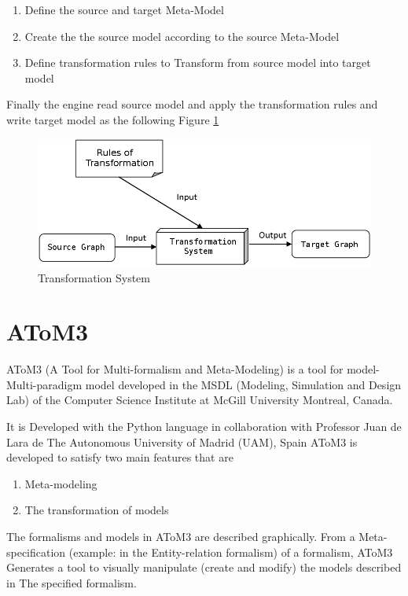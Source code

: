 \begin{enumerate}
\item Define the  source and target Meta-Model 
\item Create the the source model according to the source Meta-Model 
\item Define transformation rules to Transform from source model into target model 
\end{enumerate} 
Finally the engine read source model and apply the transformation rules and write target model as the following Figure \ref{fig:Transformation System}
 
\begin{figure}[th]
	\centering
		\includegraphics[scale=0.4]{ch3/img/systemTran}
	\caption{\label{fig:Transformation System}Transformation System\cite{ch3-img}}
\end{figure} 

\section{AToM3}

AToM3 (A Tool for Multi-formalism and Meta-Modeling) is a tool for model-
Multi-paradigm model developed in the MSDL (Modeling, Simulation and
Design Lab) of the Computer Science Institute at McGill University Montreal, Canada\cite{Siteatom, ch3-atom3}.

It is Developed with the Python language in collaboration with Professor Juan de Lara de
The Autonomous University of Madrid (UAM), Spain  
AToM3 is developed to satisfy two main features that are 
\begin{enumerate}
	\item Meta-modeling 
\item The transformation of models
\end{enumerate}

The formalisms and models in AToM3 are described graphically. 
From a Meta-specification (example: in the Entity-relation formalism) of a formalism, AToM3
Generates a tool to visually manipulate (create and modify) the models described in
The specified formalism.

